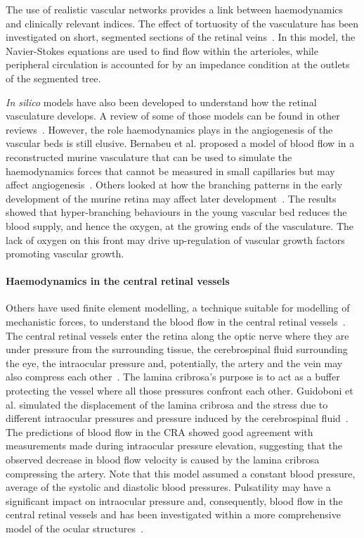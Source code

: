 \documentclass{article}
\begin{document}
The use of realistic vascular networks provides a link between haemodynamics and clinically relevant indices.
The effect of tortuosity of the vasculature has been investigated on short, segmented sections of the retinal veins~\cite{Malek_2014}.
In this model, the Navier-Stokes equations are used to find flow within the arterioles, while peripheral circulation is accounted for by an impedance condition at the outlets of the segmented tree.

\textit{In silico} models have also been developed to understand how the retinal vasculature develops.
A review of some of those models can be found in other reviews~\cite{Arciero_2019,Roberts_2016}.
However, the role haemodynamics plays in the angiogenesis of the vascular beds is still elusive.
Bernabeu et al. proposed a model of blood flow in a reconstructed murine vasculature that can be used to simulate the haemodynamics forces that cannot be measured in small capillaries but may affect angiogenesis~\cite{Bernabeu_2014}.
Others looked at how the branching patterns in the early development of the murine retina may affect later development~\cite{Mirzapour_Shafiyi_2021}.
The results showed that hyper-branching behaviours in the young vascular bed reduces the blood supply, and hence the oxygen, at the growing ends of the vasculature.
The lack of oxygen on this front may drive up-regulation of vascular growth factors promoting vascular growth.


\paragraph*{Haemodynamics in the central retinal vessels}

Others have used finite element modelling, a technique suitable for modelling of mechanistic forces, to understand the blood flow in the central retinal vessels~\cite{Guidoboni_2014,Jin_2020}.
The central retinal vessels enter the retina along the optic nerve where they are under pressure from the surrounding tissue, the cerebrospinal fluid surrounding the eye, the intraocular pressure and, potentially, the artery and the vein may also compress each other~\cite{Nickells_2012}.
The lamina cribrosa's purpose is to act as a buffer protecting the vessel where all those pressures confront each other.
Guidoboni et al. simulated the displacement of the lamina cribrosa and the stress due to different intraocular pressures and pressure induced by the cerebrospinal fluid~\cite{Guidoboni_2014}.
The predictions of blood flow in the CRA showed good agreement with measurements made during intraocular pressure elevation, suggesting that the observed decrease in blood flow velocity is caused by the lamina cribrosa compressing the artery.
Note that this model assumed a constant blood pressure, average of the systolic and diastolic blood pressures.
Pulsatility may have a significant impact on intraocular pressure and, consequently, blood flow in the central retinal vessels and has been investigated within a more comprehensive model of the ocular structures~\cite{Jin_2020}.
\end{document}

